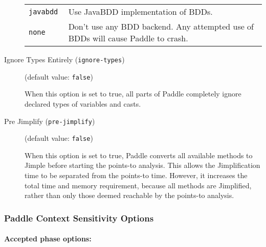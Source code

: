\documentclass{article}
\begin{document}
\begin{description}
\begin{longtable}{p{1in}p{4in}}
{\tt javabdd }
&

Use JavaBDD implementation of BDDs.
\\

{\tt none }
&

Don't use any BDD backend. Any attempted use of BDDs will cause Paddle to crash.
\\

\end{longtable}


\item[Ignore Types Entirely ({\tt ignore-types})]
(default value: {\tt false})




When this option is set to true, all parts of Paddle completely ignore
declared types of variables and casts.
        


\item[Pre Jimplify ({\tt pre-jimplify})]
(default value: {\tt false})




When this option is set to true, Paddle converts all available methods to Jimple
before starting the points-to analysis. This allows the Jimplification
time to be separated from the points-to time. However, it increases the
total time and memory requirement, because all methods are Jimplified,
rather than only those deemed reachable by the points-to analysis.
        


\end{description}

\subsubsection{Paddle Context Sensitivity Options}


\paragraph{Accepted phase options:} 
\end{document}
